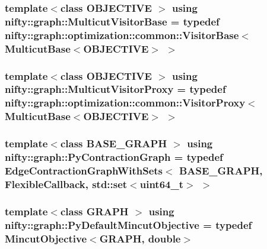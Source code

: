 \subsubsection[{Multicut\+Visitor\+Base}]{\setlength{\rightskip}{0pt plus 5cm}template$<$class O\+B\+J\+E\+C\+T\+I\+V\+E $>$ using {\bf nifty\+::graph\+::\+Multicut\+Visitor\+Base} = typedef {\bf nifty\+::graph\+::optimization\+::common\+::\+Visitor\+Base}$<$ {\bf Multicut\+Base}$<$O\+B\+J\+E\+C\+T\+I\+V\+E$>$ $>$}\label{namespacenifty_1_1graph_a33375e819f3dda82c6458bdc3cfbe81a}
\hypertarget{namespacenifty_1_1graph_a53f439b765cf049a489391b5a4dd7c36}{}
\subsubsection[{Multicut\+Visitor\+Proxy}]{\setlength{\rightskip}{0pt plus 5cm}template$<$class O\+B\+J\+E\+C\+T\+I\+V\+E $>$ using {\bf nifty\+::graph\+::\+Multicut\+Visitor\+Proxy} = typedef {\bf nifty\+::graph\+::optimization\+::common\+::\+Visitor\+Proxy}$<$ {\bf Multicut\+Base}$<$O\+B\+J\+E\+C\+T\+I\+V\+E$>$ $>$}\label{namespacenifty_1_1graph_a53f439b765cf049a489391b5a4dd7c36}
\hypertarget{namespacenifty_1_1graph_aa9ab054f2ea0df09d60d6adf1c7ee6b3}{}
\subsubsection[{Py\+Contraction\+Graph}]{\setlength{\rightskip}{0pt plus 5cm}template$<$class B\+A\+S\+E\+\_\+\+G\+R\+A\+P\+H $>$ using {\bf nifty\+::graph\+::\+Py\+Contraction\+Graph} = typedef {\bf Edge\+Contraction\+Graph\+With\+Sets}$<$ B\+A\+S\+E\+\_\+\+G\+R\+A\+P\+H, {\bf Flexible\+Callback}, std\+::set$<$uint64\+\_\+t$>$ $>$}\label{namespacenifty_1_1graph_aa9ab054f2ea0df09d60d6adf1c7ee6b3}
\hypertarget{namespacenifty_1_1graph_ab129a9876a746581d5ce26f3af9f676e}{}
\subsubsection[{Py\+Default\+Mincut\+Objective}]{\setlength{\rightskip}{0pt plus 5cm}template$<$class G\+R\+A\+P\+H $>$ using {\bf nifty\+::graph\+::\+Py\+Default\+Mincut\+Objective} = typedef {\bf Mincut\+Objective}$<$G\+R\+A\+P\+H, double$>$}\label{namespacenifty_1_1graph_ab129a9876a746581d5ce26f3af9f676e}
\hypertarget{namespacenifty_1_1graph_af3761eb48c25055911bbb9d073dccbf4}{}
